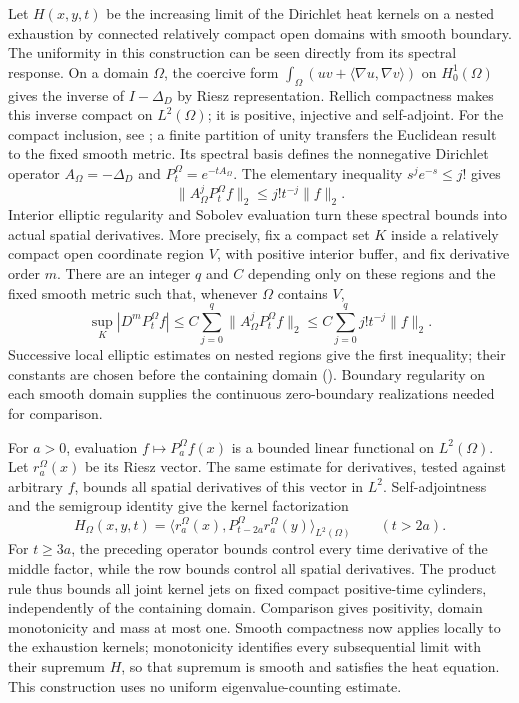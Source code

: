 Let $H(x,y,t)$ be the increasing limit of the Dirichlet heat kernels
on a nested exhaustion by connected relatively compact open domains
with smooth boundary.  The uniformity in this construction can be
seen directly from its spectral response.  On a domain $\Omega$,
the coercive form
$\int_\Omega(uv+\langle\nabla u,\nabla v\rangle)$ on
$H^1_0(\Omega)$ gives the inverse of $I-\Delta_D$ by Riesz
representation.  Rellich compactness makes this inverse compact
on $L^2(\Omega)$; it is positive, injective and self-adjoint.
For the compact inclusion, see
\cite[Section 5.7, Theorem 1 and the zero-boundary remark,
pp.~286, 289]{Evans2010}; a finite partition of unity transfers
the Euclidean result to the fixed smooth metric.
Its spectral basis defines the nonnegative Dirichlet operator
$A_\Omega=-\Delta_D$ and $P_t^\Omega=e^{-tA_\Omega}$.
The elementary inequality $s^je^{-s}\leq j!$ gives
\[
 \|A_\Omega^jP_t^\Omega f\|_2\leq j!t^{-j}\|f\|_2.
\]
Interior elliptic regularity and Sobolev evaluation turn these
spectral bounds into actual spatial derivatives.  More precisely,
fix a compact set $K$ inside a relatively compact open coordinate
region $V$, with positive interior buffer, and fix derivative order
$m$.  There are an integer $q$ and
$C$ depending only on these regions and the fixed smooth metric such
that, whenever $\Omega$ contains $V$,
\[
 \sup_K|D^mP_t^\Omega f|
 \leq C\sum_{j=0}^q\|A_\Omega^jP_t^\Omega f\|_2
 \leq C\sum_{j=0}^q j!t^{-j}\|f\|_2.
\]
Successive local elliptic estimates on nested regions give the first
inequality; their constants are chosen before the containing domain
(\cite[Section 6.3.1, Theorems 1--2, pp.~327, 332--333]{Evans2010}).
Boundary regularity on each smooth domain supplies the continuous
zero-boundary realizations needed for comparison.

For $a>0$, evaluation $f\mapsto P_a^\Omega f(x)$ is a bounded
linear functional on $L^2(\Omega)$.  Let $r_a^\Omega(x)$ be its
Riesz vector.  The same estimate for derivatives, tested against
arbitrary $f$, bounds all spatial derivatives of this vector in
$L^2$.  Self-adjointness and the semigroup identity give the kernel
factorization
\[
 H_\Omega(x,y,t)=
 \bigl\langle r_a^\Omega(x),
      P_{t-2a}^\Omega r_a^\Omega(y)\bigr\rangle_{L^2(\Omega)}
                     \qquad(t>2a).
\]
For $t\geq3a$, the preceding operator bounds control every time
derivative of the middle factor, while the row bounds control all
spatial derivatives.  The product rule thus bounds all joint kernel
jets on fixed compact positive-time cylinders, independently of
the containing domain.  Comparison gives positivity, domain
monotonicity and mass at most one.  Smooth compactness now applies
locally to the exhaustion kernels; monotonicity identifies every
subsequential limit with their supremum $H$, so that supremum is
smooth and satisfies the heat equation.  This construction uses no
uniform eigenvalue-counting estimate.

